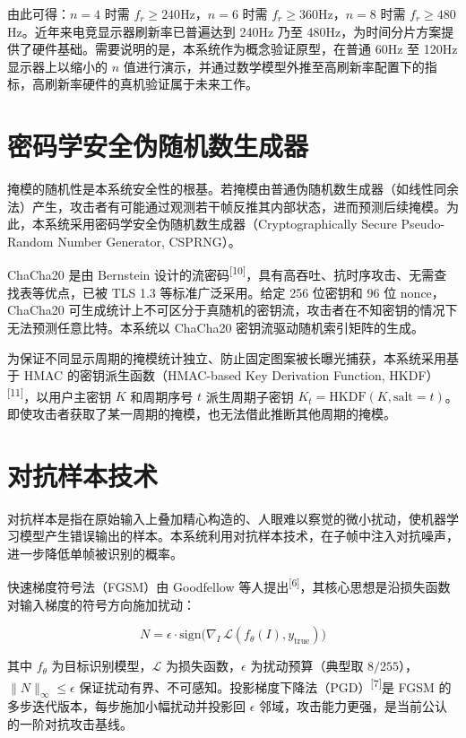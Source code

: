 由此可得：$n=4$ 时需 $f_r \ge 240$Hz，$n=6$ 时需 $f_r \ge 360$Hz，$n=8$ 时需 $f_r \ge 480$Hz。近年来电竞显示器刷新率已普遍达到 240Hz 乃至 480Hz，为时间分片方案提供了硬件基础。需要说明的是，本系统作为概念验证原型，在普通 60Hz 至 120Hz 显示器上以缩小的 $n$ 值进行演示，并通过数学模型外推至高刷新率配置下的指标，高刷新率硬件的真机验证属于未来工作。

\section{密码学安全伪随机数生成器}

掩模的随机性是本系统安全性的根基。若掩模由普通伪随机数生成器（如线性同余法）产生，攻击者有可能通过观测若干帧反推其内部状态，进而预测后续掩模。为此，本系统采用密码学安全伪随机数生成器（Cryptographically Secure Pseudo-Random Number Generator, CSPRNG）。

ChaCha20 是由 Bernstein 设计的流密码\textsuperscript{[10]}，具有高吞吐、抗时序攻击、无需查找表等优点，已被 TLS 1.3 等标准广泛采用。给定 256 位密钥和 96 位 nonce，ChaCha20 可生成统计上不可区分于真随机的密钥流，攻击者在不知密钥的情况下无法预测任意比特。本系统以 ChaCha20 密钥流驱动随机索引矩阵的生成。

为保证不同显示周期的掩模统计独立、防止固定图案被长曝光捕获，本系统采用基于 HMAC 的密钥派生函数（HMAC-based Key Derivation Function, HKDF）\textsuperscript{[11]}，以用户主密钥 $K$ 和周期序号 $t$ 派生周期子密钥 $K_t = \mathrm{HKDF}(K, \text{salt}=t)$。即使攻击者获取了某一周期的掩模，也无法借此推断其他周期的掩模。

\section{对抗样本技术}

对抗样本是指在原始输入上叠加精心构造的、人眼难以察觉的微小扰动，使机器学习模型产生错误输出的样本。本系统利用对抗样本技术，在子帧中注入对抗噪声，进一步降低单帧被识别的概率。

快速梯度符号法（FGSM）由 Goodfellow 等人提出\textsuperscript{[6]}，其核心思想是沿损失函数对输入梯度的符号方向施加扰动：

\begin{equation}
N = \epsilon \cdot \mathrm{sign}\big(\nabla_I\, \mathcal{L}(f_\theta(I), y_{\text{true}})\big)
\end{equation}

其中 $f_\theta$ 为目标识别模型，$\mathcal{L}$ 为损失函数，$\epsilon$ 为扰动预算（典型取 $8/255$），$\|N\|_\infty \le \epsilon$ 保证扰动有界、不可感知。投影梯度下降法（PGD）\textsuperscript{[7]}是 FGSM 的多步迭代版本，每步施加小幅扰动并投影回 $\epsilon$ 邻域，攻击能力更强，是当前公认的一阶对抗攻击基线。

